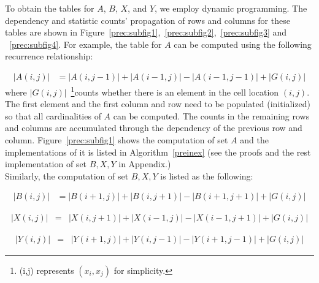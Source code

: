 \documentclass[AMA,LATO1COL]{WileyNJD-v2}
\begin{document}
To obtain the tables for $A$, $B$, $X$, and $Y$, we employ dynamic programming. The dependency and statistic counts' propagation of rows and columns for these tables are shown in Figure~\ref{prec:subfig1},~\ref{prec:subfig2},~\ref{prec:subfig3} and ~\ref{prec:subfig4}. For example, the table for $A$ can be computed using the following recurrence relationship:


\begin{eqnarray}
|A(i,j)|  &= |A(i,j-1)| + |A(i-1,j)| - |A(i-1,j-1)|  + |G(i,j)|
\end{eqnarray}
\normalsize
where $|G(i,j)|$~\footnote{(i,j) represents $(x_i,x_j)$ for simplicity.}counts whether there is an element in the cell location $(i,j)$. The first element and the first column and row need to be populated (initialized) so that all cardinalities of $A$ can be computed. The counts in the remaining rows and columns are accumulated through the dependency of the previous row and column. Figure~\ref{prec:subfig1} shows the computation of set $A$ and the implementations of it is listed in Algorithm~\ref{preinex} (see the proofs and the rest implementation of set $B,X,Y$ in Appendix.)\\

Similarly, the computation of set $B,X,Y$ is listed as the following:

\begin{eqnarray}
|B(i,j)|  &= |B(i+1,j)| + |B(i,j+1)| - |B(i+1,j+1)| + |G(i,j)|
\end{eqnarray}
\normalsize

\begin{eqnarray}
|X(i,j)|  &= & |X(i,j+1)| + |X(i-1,j)| - |X(i-1,j+1)| + |G(i,j)|
\end{eqnarray}
\normalsize

\begin{eqnarray}
|Y(i,j)|  &= & |Y(i+1,j)| + |Y(i,j-1)| - |Y(i+1,j-1)| + |G(i,j)|
\end{eqnarray}
\normalsize
\end{document}

